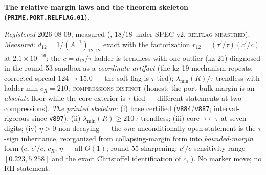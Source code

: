 \par\smallskip\noindent\textbf{The relative margin laws and
the theorem skeleton
(\texttt{PRIME.PORT.\allowbreak RELFLAG.01}).}
{\sloppy
\emph{Registered} 2026-08-09, measured
(, $18/18$ under SPEC v2,
\textsc{relflag-measured}).  \emph{Measured:} $d_{12} =
1/(A^{-1})_{12,12}$ exact with the factorization $r_{12} =
(\tau'/\tau)(c'/c)$ at $2.1\times10^{-16}$; the $c =
d_{12}/\tau$ ladder is trendless with one outlier (kz 21)
diagnosed in the round-53 sandbox as a \emph{coordinate
artifact} (the kz-19 mechanism repeats; corrected spread $124
\to 15.0$ --- the soft flag is $\tau$-tied);
$\lambda_{\min}(R)/\tau$ trendless with ladder min $c_R =
210$; \textsc{compressions-distinct} (honest: the port bulk
margin is an \emph{absolute} floor while the core exterior is
$\tau$-tied --- different statements at two compressions).
\emph{The printed skeleton:} (i) base certified
(\texttt{v884}/\texttt{v887}; interval-rigorous since
\texttt{v897}); (ii) $\lambda_{\min}(R) \ge
210\,\tau$ trendless; (iii) core $\leftrightarrow$ $\tau$ at
seven digits; (iv) $\eta > 0$ non-decaying --- the \emph{one}
unconditionally open statement is the $\tau$-sign inheritance,
reorganized from collapsing-margin form into
\emph{bounded-margin} form ($c$, $c'/c$, $c_R$, $\eta$ --- all
$O(1)$; round-55 sharpening: $c'/c$ sensitivity range
$[0.223, 5.258]$ and the exact Christoffel identification of
$c$, ).  No marker move;
no RH statement.\par}


